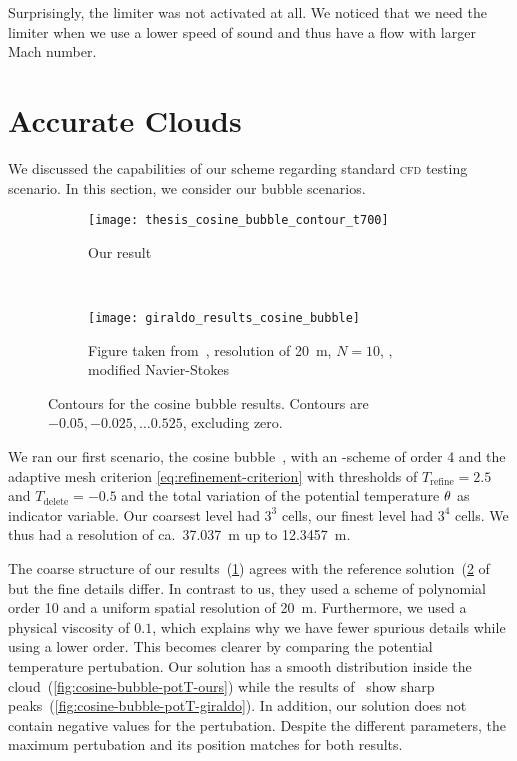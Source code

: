 Surprisingly, the limiter was not activated at all.
We noticed that we need the limiter when we use a lower speed of sound and thus have a flow with larger Mach number.

\section{Accurate Clouds}\label{sec:results-cloud}
We discussed the capabilities of our scheme regarding standard \textsc{cfd} testing scenario.
In this section, we consider our bubble scenarios.
\begin{figure}[htb]
  \centering
  \begin{subfigure}[t]{0.5\textwidth}
    \centering
    \texttt{[image: thesis\_cosine\_bubble\_contour\_t700]}
    \caption{\label{fig:cosine-bubble-contour-ours}%
      Our result}
  \end{subfigure}~%
  \begin{subfigure}[t]{0.5\textwidth}
    \centering
    \texttt{[image: giraldo\_results\_cosine\_bubble]}
    \caption{\label{fig:cosine-bubble-contour-giraldo}%
      Figure taken from~\cite{giraldo2008study}, resolution of \SI{20}{\m}, $N = 10$, \dg{}, modified Navier-Stokes} %
  \end{subfigure}
  \caption{\label{fig:cosine-bubble-contour}%
    Contours for the cosine bubble results.
    Contours are $-0.05, -0.025, \ldots 0.525$, excluding zero.
  }
\end{figure}
We ran our first scenario, the cosine bubble~, with an \aderdg{}-scheme of order 4 and the adaptive mesh criterion \cref{eq:refinement-criterion} with thresholds of $T_\text{refine} = 2.5$ and $T_\text{delete} = -0.5$ and the total variation of the potential temperature $\theta$ as indicator variable.
Our coarsest level had $3^3$ cells, our finest level had $3^4$ cells.
We thus had a resolution of ca.\ \SI{37.037}{\m} up to \SI{12.3457}{\m}.

The coarse structure of our results~(\cref{fig:cosine-bubble-contour-ours}) agrees with the reference solution~(\cref{fig:cosine-bubble-contour-giraldo} of~\cite{giraldo2008study} but the fine details differ.
In contrast to us, they used a scheme of polynomial order 10 and a uniform spatial resolution of \SI{20}{\m}.
Furthermore, we used a physical viscosity of $0.1$, which explains why we have fewer spurious details while using a lower order.
This becomes clearer by comparing the potential temperature pertubation.
Our solution has a smooth distribution inside the cloud~(\cref{fig:cosine-bubble-potT-ours}) while the results of~\cite{giraldo2008study} show sharp peaks~(\cref{fig:cosine-bubble-potT-giraldo}).
In addition, our solution does not contain negative values for the pertubation.
Despite the different parameters, the maximum pertubation and its position matches for both results.

